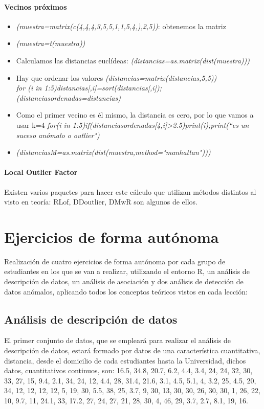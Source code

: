 \documentclass[a4paper, 12pt]{article}
\begin{document}
        \paragraph{Vecinos próximos}
        \begin{itemize}
            \item \emph{(muestra=matrix(c(4,4,4,3,5,5,1,1,5,4,),2,5))}: obtenemos la matriz
            \item \emph{(muestra=t(muestra))}
            \item Calculamos las distancias euclídeas: \emph{(distancias=as.matrix(dist(muestra)))}
            \item Hay que ordenar los valores \emph{(distancias=matrix(distancias,5,5))}
            \\ \emph{for (i in 1:5){distancias[,i]=sort(distancias[,i])}; (distanciasordenadas=distancias)}
            \item Como el primer vecino es él mismo, la distancia es cero, por lo que vamos a usar k=4 \emph{for(i in 1:5){if(distanciasordenadas[4,i]>2.5){print(i);print(\textquotedblleft es un suceso anómalo o outlier")}}}
            \item \emph{(distanciasM=as.matrix(dist(muestra,method="manhattan")))}
        \end{itemize}

        \paragraph{Local Outlier Factor}
            Existen varios paquetes para hacer este cálculo que utilizan métodos distintos al visto en teoría: RLof, DDoutlier, DMwR son algunos de ellos.
    
\section{Ejercicios de forma autónoma}
    Realización de cuatro ejercicios de forma autónoma por cada grupo de estudiantes en los que se van a realizar, utilizando el entorno R, un análisis de descripción de datos, un análisis de asociación y dos análisis de detección de datos anómalos, aplicando todos los conceptos teóricos vistos en cada lección:
    
    \subsection{Análisis de descripción de datos}
        El primer conjunto de datos, que se empleará para realizar el análisis de descripción de datos, estará formado por datos de una característica cuantitativa, distancia, desde el domicilio de cada estudiantes hasta la Universidad, dichos datos, cuantitativos continuos, son: 16.5, 34.8, 20.7, 6.2, 4.4, 3.4, 24, 24, 32, 30, 33, 27, 15, 9.4, 2.1, 34, 24, 12, 4.4, 28, 31.4, 21.6, 3.1, 4.5, 5.1, 4, 3.2, 25, 4.5, 20, 34, 12, 12, 12, 12, 5, 19, 30, 5.5, 38, 25, 3.7, 9, 30, 13, 30, 30, 26, 30, 30, 1, 26, 22, 10, 9.7, 11, 24.1, 33, 17.2, 27, 24, 27, 21, 28, 30, 4, 46, 29, 3.7, 2.7, 8.1, 19, 16.
    
\end{document}
